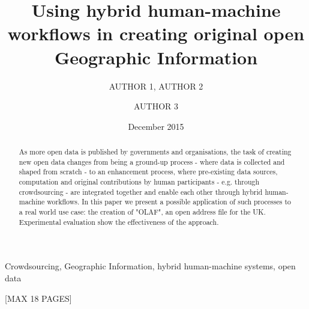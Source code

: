 \documentclass{llncs}
\title{Using hybrid human-machine workflows in creating original open Geographic Information}
\author{AUTHOR 1\inst{1}, AUTHOR 2\inst{1} \and AUTHOR 3\inst{2}}
\institute{INSTITUTE 1 \and INSTITUTE 2}
\date{December 2015}
\begin{document}
\maketitle

\begin{abstract}
As more open data is published by governments and organisations, the task of creating new open data changes from being a ground-up process - where data is collected and shaped from scratch - to an enhancement process, where pre-existing data sources, computation and original contributions by human participants - e.g. through crowdsourcing - are integrated together and enable each other through hybrid human-machine workflows. In this paper we present a possible application of such processes to a real world use case: the creation of "OLAF", an open address file for the UK. Experimental evaluation show the effectiveness of the approach.
\end{abstract}

\begin{keywords}
Crowdsourcing, Geographic Information, hybrid human-machine systems, open data 
\end{keywords}

[MAX 18 PAGES]









\end{document}
